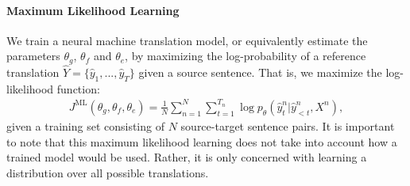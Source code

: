 

\paragraph{Maximum Likelihood Learning}

We train a neural machine translation model, or equivalently estimate the parameters $\theta_g$, $\theta_f$ and $\theta_e$, by maximizing the log-probability of a reference translation $\hat{Y}=\{\hat{y}_1, ..., \hat{y}_T\}$ given a source sentence. That is, we maximize the log-likelihood function:
\begin{align*}
J^{\text{ML}}(\theta_g, \theta_f, \theta_e) = \frac{1}{N} \sum_{n=1}^N \sum_{t=1}^{T_n} \log p_{\theta}(\hat{y}_t^n| \hat{y}_{<t}^n, X^n),
\end{align*}
given a training set consisting of $N$ source-target sentence pairs. It is important to note that this maximum likelihood learning does not take into account how a trained model would be used. Rather, it is only concerned with learning a distribution over all possible translations. 




